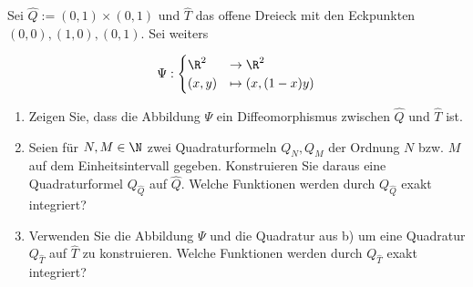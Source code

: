 
\begin{exercise}

  Sei $\hat Q := (0, 1) \times (0, 1)$ und $\hat T$ das offene Dreieck mit den Eckpunkten $(0, 0), (1, 0), (0, 1)$.
  Sei weiters

  \begin{align*}
    \Psi:
    \begin{cases}
      \R^2   & \to \R^2 \\
      (x, y) & \mapsto (x, (1 - x)y)
    \end{cases}
  \end{align*}

  \begin{enumerate}[label = \textbf{\alph*)}]

    \item Zeigen Sie, dass die Abbildung $\Psi$ ein Diffeomorphismus zwischen $\hat Q$ und $\hat T$ ist.

    \item Seien für $N, M \in \N$ zwei Quadraturformeln $Q_N, Q_M$ der Ordnung $N$ bzw. $M$ auf dem Einheitsintervall gegeben.
    Konstruieren Sie daraus eine Quadraturformel $Q_{\hat Q}$ auf $\hat Q$.
    Welche Funktionen werden durch $Q_{\hat Q}$ exakt integriert?

    \item Verwenden Sie die Abbildung $\Psi$ und die Quadratur aus b) um eine Quadratur $Q_{\hat T}$ auf $\hat T$ zu konstruieren.
    Welche Funktionen werden durch $Q_{\hat T}$ exakt integriert?

  \end{enumerate}

  \end{exercise}



